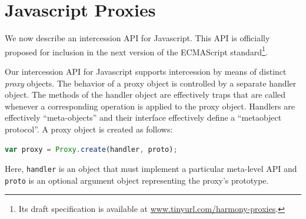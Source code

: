 \documentclass{sig-alternate}
\newcommand{\noSuchMethod}{\texttt{\_\_noSuchMethod\_\_}}
\begin{document}

\section{Javascript Proxies}
\label{sec:proxies_for_javascript}

We now describe an intercession API for Javascript. This API is officially proposed for inclusion in the next version of the ECMAScript standard\footnote{Its draft specification is available at \url{www.tinyurl.com/harmony-proxies}.}.

Our intercession API for Javascript supports intercession by means of distinct \emph{proxy} objects. The behavior of a proxy object is controlled by a separate handler object. The methods of the handler object are effectively traps that are called whenever a corresponding operation is applied to the proxy object. Handlers are effectively ``meta-objects'' and their interface effectively define a ``metaobject protocol''. A proxy object is created as follows:

\begin{lstlisting}[language=javascript]
var proxy = Proxy.create(handler, proto);
\end{lstlisting}

Here, \texttt{handler} is an object that must implement a particular meta-level API and \texttt{proto} is an optional argument object representing the proxy's prototype.
\end{document}
